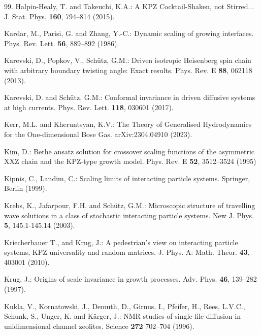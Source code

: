 \documentclass[12pt]{article}
\begin{document}
\begin{thebibliography}{99.}
Halpin-Healy, T. and Takeuchi, K.A.:
A KPZ Cocktail-Shaken, not Stirred...
J. Stat. Phys. \textbf{160}, 794--814 (2015).

Kardar, M., Parisi, G. and Zhang, Y.-C.:
Dynamic scaling of growing interfaces.
Phys. Rev. Lett. {\bf  56}, 889--892 (1986).

Karevski, D., Popkov, V., Sch\"utz, G.M.:
Driven isotropic Heisenberg spin chain with arbitrary boundary twisting angle: Exact results.
Phys. Rev. E \textbf{88}, 062118 (2013).

Karevski, D. and Sch\"utz, G.M.:
Conformal invariance in driven diffusive systems at high currents.
Phys. Rev. Lett. \textbf{118}, 030601 (2017).

Kerr, M.L.  and Kheruntsyan, K.V.:
The Theory of Generalised Hydrodynamics for the One-dimensional Bose Gas.
arXiv:2304.04910 (2023).

Kim, D.:
Bethe ansatz solution for crossover scaling functions of the asymmetric XXZ chain 
and the KPZ-type growth model.
Phys. Rev. E \textbf{52}, 3512--3524 (1995)

Kipnis, C., Landim, C.:
Scaling limits of interacting particle systems.
Springer, Berlin (1999).

Krebs, K., Jafarpour, F.H. and Sch\"utz, G.M.:
Microscopic structure of travelling wave solutions in a class of 
stochastic interacting particle systems.
New J. Phys. \textbf{5}, 145.1-145.14 (2003).

Kriecherbauer T., and Krug, J.:
A pedestrian's view on interacting particle systems, KPZ universality and random matrices.
J. Phys. A: Math. Theor. \textbf{43}, 403001 (2010).

Krug, J.:
Origins of scale invariance in growth processes.
Adv. Phys. \textbf{46}, 139--282 (1997).

Kukla, V., Kornatowski, J., Demuth, D., Girnus, I.,
Pfeifer, H., Rees, L.V.C., Schunk, S., Unger, K. and K\"arger, J.: 
NMR studies of single-file diffusion in unidimensional channel zeolites.
Science \textbf{272} 702--704 (1996).


\end{thebibliography}
\end{document}
